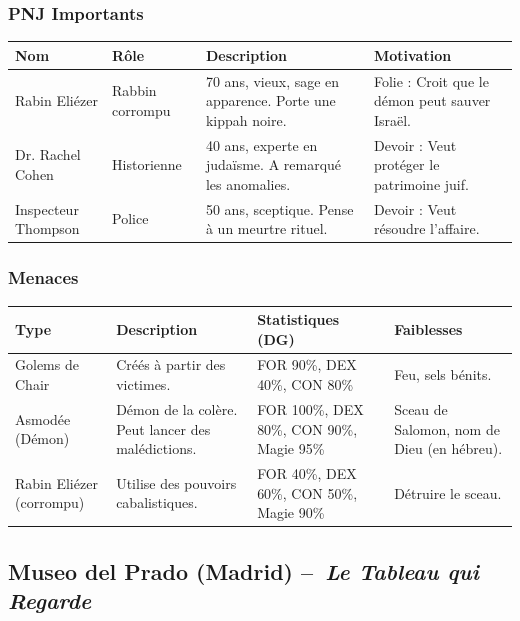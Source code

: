 \documentclass[10pt,a5paper,twoside]{book}
\begin{document}
\newpage

\subsubsection*{PNJ Importants}
\begin{center}
	\begin{tabular}{|P{2cm}|P{3cm}|P{3.5cm}|P{2.5cm}|}
	\hline
	\textbf{Nom} 			& \textbf{Rôle} 	& \textbf{Description} 										& \textbf{Motivation} \\ \hline
	Rabin Eliézer 			& Rabbin corrompu 	& 70 ans, vieux, sage en apparence. Porte une kippah noire. & Folie : Croit que le démon peut sauver Israël. \\ \hline
	Dr. Rachel Cohen 		& Historienne 		& 40 ans, experte en judaïsme. A remarqué les anomalies. 	& Devoir : Veut protéger le patrimoine juif. \\ \hline
	Inspecteur Thompson 	& Police 			& 50 ans, sceptique. Pense à un meurtre rituel. 			& Devoir : Veut résoudre l'affaire. \\ \hline
	\end{tabular}
\end{center}

\subsubsection*{Menaces}
\begin{center}
	\begin{tabular}{|P{2cm}|P{3cm}|P{3.5cm}|P{2.5cm}|}
	\hline
	\textbf{Type} 				& \textbf{Description} 								& \textbf{Statistiques (DG)} 				& \textbf{Faiblesses} \\ \hline
	Golems de Chair 			& Créés à partir des victimes.						& FOR 90\%, DEX 40\%, CON 80\% 				& Feu, sels bénits. \\ \hline
	Asmodée (Démon) 			& Démon de la colère. Peut lancer des malédictions. & FOR 100\%, DEX 80\%, CON 90\%, Magie 95\% & Sceau de Salomon, nom de Dieu (en hébreu). \\ \hline
	Rabin Eliézer (corrompu) 	& Utilise des pouvoirs cabalistiques. 				& FOR 40\%, DEX 60\%, CON 50\%, Magie 90\% 	& Détruire le sceau. \\ \hline
	\end{tabular}
\end{center}

\newpage

\subsection{Museo del Prado (Madrid) --~\newline \textit{Le Tableau qui Regarde}}
\end{document}
